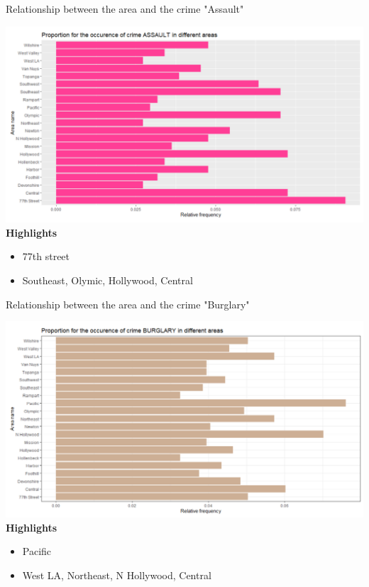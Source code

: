 \documentclass{beamer}\usepackage[]{graphicx}\usepackage[]{xcolor}
\makeatletter
\def\maxwidth{ %
  \ifdim\Gin@nat@width>\linewidth
    \linewidth
  \else
    \Gin@nat@width
  \fi
}
\newenvironment{knitrout}{}{} %
\makeatother
\begin{document}
\begin{frame}[fragile]{Relationship between the area and the crime "Assault"}

\begin{knitrout}
\color{fgcolor}
\includegraphics[width=\maxwidth]{figure/assault.png} 
\end{knitrout}
\textbf{Highlights}
\begin{itemize}
\item 77th street 
\item Southeast, Olymic, Hollywood, Central

\end{itemize}
\end{frame}

\begin{frame}[fragile]{Relationship between the area and the crime "Burglary"}

\begin{knitrout}
\color{fgcolor}
\includegraphics[width=\maxwidth]{figure/burglary.png} 
\end{knitrout}
\textbf{Highlights}
\begin{itemize}
\item Pacific 
\item West LA, Northeast, N Hollywood, Central

\end{itemize}
\end{frame}
\end{document}
